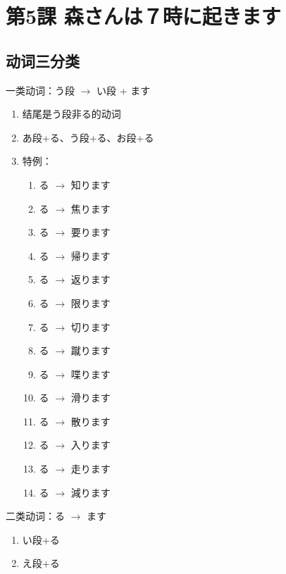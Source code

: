 \section{第5課 森さんは７時に起きます}


\subsection{动词三分类}

一类动词：う段 $\rightarrow$ い段 + ます

\begin{enumerate}
    \item 结尾是う段非る的动词
    \item あ段+る、う段+る、お段+る
    \item 特例：
    \begin{enumerate}
        \item {}る $\rightarrow$ 知ります
        \item {}る $\rightarrow$ 焦ります
        \item {}る $\rightarrow$ 要ります
        \item {}る $\rightarrow$ 帰ります
        \item {}る $\rightarrow$ 返ります
        \item {}る $\rightarrow$ 限ります
        \item {}る $\rightarrow$ 切ります
        \item {}る $\rightarrow$ 蹴ります
        \item {}る $\rightarrow$ 喋ります
        \item {}る $\rightarrow$ 滑ります
        \item {}る $\rightarrow$ 散ります
        \item {}る $\rightarrow$ 入ります
        \item {}る $\rightarrow$ 走ります
        \item {}る $\rightarrow$ 減ります
    \end{enumerate}
\end{enumerate}

二类动词：る $\rightarrow$ ます

\begin{enumerate}
    \item い段+る
    \item え段+る
\end{enumerate}

